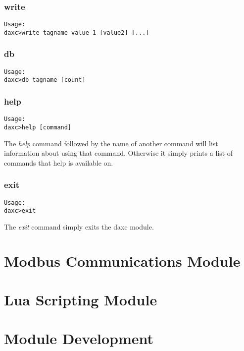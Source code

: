 \subsection{write}
\begin{verbatim}
Usage:
daxc>write tagname value 1 [value2] [...]
\end{verbatim}

\subsection{db}
\begin{verbatim}
Usage:
daxc>db tagname [count]
\end{verbatim}

\subsection{help}
\begin{verbatim}
Usage:
daxc>help [command]
\end{verbatim}

The \textit{help} command followed by the name of another command will list information about using that command. Otherwise it simply prints a list of commands that help is available on.

\subsection{exit}
\begin{verbatim}
Usage:
daxc>exit
\end{verbatim}
The \textit{exit} command simply exits the daxc module.

\chapter{Modbus Communications Module}

\chapter{Lua Scripting Module}


\chapter{Module Development}


